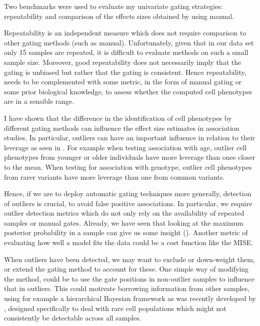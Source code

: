Two benchmarks were used to evaluate my univariate gating strategies: repeatability and comparison of the effects sizes obtained 
by \citet{Dendrou:2009dv} using manual.

Repeatability is an independent measure which does not require comparison to other gating methods (such as manual).
Unfortunately, given that in our data set only 15 samples are repeated, it is difficult to evaluate methods on such a small sample size.
Moreover, good repeatability does not necessarily imply that the gating is unbiased but rather that the gating is consistent.
Hence repeatability, needs to be complemented with some metric, in the form of manual gating or some prior biological knowledge,
to assess whether the computed cell phenotypes are in a sensible range.

I have shown that the difference in the identification of cell phenotypes by different gating methods can influence the effect size estimates in association studies.
In particular, outliers can have an important influence in relation to their leverage as seen in .
For example when testing association with age, outlier cell phenotypes from younger or older individuals have more leverage than ones closer to the mean.
When testing for association with genotype, outlier cell phenotypes from rarer variants have more leverage than one from common variants.

Hence, if we are to deploy automatic gating techniques more generally, detection of outliers is crucial, to avoid false positive associations.
In particular, we require outlier detection metrics which do not only rely on the availability of repeated samples or manual gates.
Already, we have seen that looking at the maximum posterior probability in a sample can give us some insight ().
Another metric of evaluating how well a model fits the data could be a cost function like the \gls{MISE}.

When outliers have been detected, we may want to exclude or down-weight them, or extend the gating method to account for these.
One simple way of modifying the method, could be to use the gate positions in non-outlier samples to influence that in outliers.
This could motivate borrowing information from other samples, using for example a hierarchical Bayesian framework as was recently developed by \citet{Cron:2013dh},
designed specifically to deal with rare cell populations which might not consistently be detectable across all samples.

